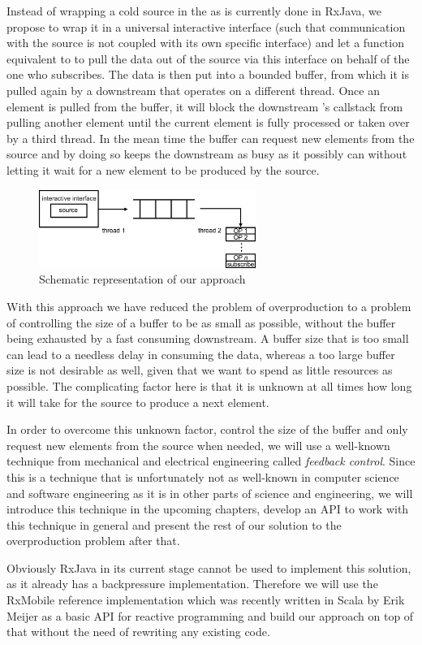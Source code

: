 Instead of wrapping a cold source in the  as is currently done in RxJava, we propose to wrap it in a universal interactive interface (such that communication with the source is not coupled with its own specific interface) and let a function equivalent to to  pull the data out of the source via this interface on behalf of the one who subscribes. The data is then put into a bounded buffer, from which it is pulled again by a downstream \obs that operates on a different thread. Once an element is pulled from the buffer, it will block the downstream \obs's callstack from pulling another element until the current element is fully processed or taken over by a third thread. In the mean time the buffer can request new elements from the source and by doing so keeps the downstream \obs as busy as it possibly can without letting it wait for a new element to be produced by the source.

\begin{figure}[H]
	\begin{center}
		\includegraphics[width=0.63\textwidth]{figures/Approach.png}
	\end{center}
	\label{fig:new-approach}
	\caption{Schematic representation of our approach}
\end{figure}

With this approach we have reduced the problem of overproduction to a problem of controlling the size of a buffer to be as small as possible, without the buffer being exhausted by a fast consuming downstream. A buffer size that is too small can lead to a needless delay in consuming the data, whereas a too large buffer size is not desirable as well, given that we want to spend as little resources as possible. The complicating factor here is that it is unknown at all times how long it will take for the source to produce a next element.

In order to overcome this unknown factor, control the size of the buffer and only request new elements from the source when needed, we will use a well-known technique from mechanical and electrical engineering called \textit{feedback control}. Since this is a technique that is unfortunately not as well-known in computer science and software engineering as it is in other parts of science and engineering, we will introduce this technique in the upcoming chapters, develop an API to work with this technique in general and present the rest of our solution to the overproduction problem after that.

Obviously RxJava in its current stage cannot be used to implement this solution, as it already has a backpressure implementation. Therefore we will use the RxMobile \cite{RxMobile} reference implementation which was recently written in Scala by Erik Meijer as a basic API for reactive programming and build our approach on top of that without the need of rewriting any existing code.
